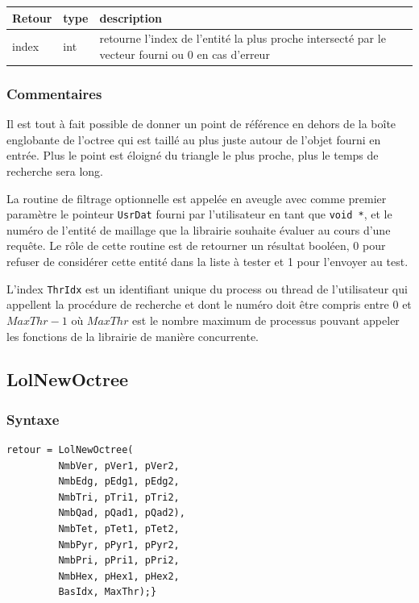 \documentclass[a4paper,12pt]{article}
\begin{document}
\medskip

\begin{tabular}{|m{3cm}|m{2cm}|m{8.5cm}|}
\hline
Retour     & type   & description \\
\hline
index      & int    & retourne l'index de l'entité la plus proche intersecté par le vecteur fourni ou 0 en cas d'erreur \\
\hline
\end{tabular}
\subsubsection*{Commentaires}
Il est tout à fait possible de donner un point de référence en dehors de la boîte englobante de l'octree qui est taillé au plus juste autour de l'objet fourni en entrée. Plus le point est éloigné du triangle le plus proche, plus le temps de recherche sera long.

La routine de filtrage optionnelle est appelée en aveugle avec comme premier paramètre le pointeur {\tt UsrDat} fourni par l'utilisateur en tant que {\tt void *}, et le numéro de l'entité de maillage que la librairie souhaite évaluer au cours d'une requête. Le rôle de cette routine est de retourner un résultat booléen, 0 pour refuser de considérer cette entité dans la liste à tester et 1 pour l'envoyer au test.

L'index {\tt ThrIdx} est un identifiant unique du process ou thread de l'utilisateur qui appellent la procédure de recherche et dont le numéro doit être compris entre $0$ et $MaxThr-1$ où $MaxThr$ est le nombre maximum de processus pouvant appeler les fonctions de la librairie de manière concurrente.


\clearpage
\subsection{LolNewOctree}

\subsubsection*{Syntaxe}
\begin{tt}
\begin{verbatim}
retour = LolNewOctree(
         NmbVer, pVer1, pVer2,
         NmbEdg, pEdg1, pEdg2,
         NmbTri, pTri1, pTri2,
         NmbQad, pQad1, pQad2),
         NmbTet, pTet1, pTet2,
         NmbPyr, pPyr1, pPyr2,
         NmbPri, pPri1, pPri2,
         NmbHex, pHex1, pHex2,
         BasIdx, MaxThr);}
\end{verbatim}
\end{tt}
\normalfont
\end{document}
